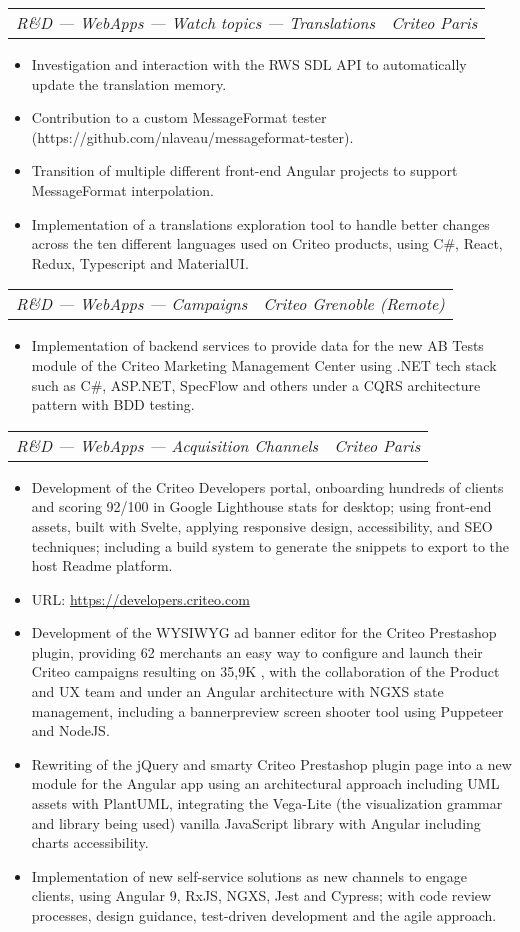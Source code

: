 \documentclass[letterpaper,11pt]{article}
\makeatletter
\newcommand{\resumeItem}[1]{
  \item\small{
    {#1 \vspace{-2pt}}
  }
}
\newcommand{\resumeSubSubheading}[2]{
    \vspace{-2pt}\item
    \begin{tabular*}{0.97\textwidth}{l@{\extracolsep{\fill}}r}
      \textit{\small#1} & \textit{\small #2} \\
    \end{tabular*}\vspace{-7pt}
}
\newcommand{\resumeItemListStart}{\begin{itemize}}
\newcommand{\resumeItemListEnd}{\end{itemize}\vspace{-5pt}}
\makeatother
\begin{document}
      \resumeSubSubheading{R\&D --- WebApps --- Watch topics --- Translations}{Criteo Paris}
      \resumeItemListStart
        \resumeItem{Investigation and interaction with the RWS SDL API to automatically update the translation memory.}
        \resumeItem{Contribution to a custom MessageFormat tester (https://github.com/nlaveau/messageformat-tester).}
        \resumeItem{Transition of multiple different front-end Angular projects to support MessageFormat interpolation.}
        \resumeItem{Implementation of a translations exploration tool to handle better changes across the ten different languages used on Criteo products, using C\#, React, Redux, Typescript and MaterialUI.}
      \resumeItemListEnd

      \resumeSubSubheading{R\&D --- WebApps --- Campaigns}{Criteo Grenoble (Remote)}
      \resumeItemListStart
        \resumeItem{Implementation of backend services to provide data for the new AB Tests module of the Criteo Marketing Management Center using .NET tech stack such as C\#, ASP.NET, SpecFlow and others under a CQRS architecture pattern with BDD testing.}
      \resumeItemListEnd

      \resumeSubSubheading{R\&D --- WebApps --- Acquisition Channels}{Criteo Paris}
      \resumeItemListStart
        \resumeItem{Development of the Criteo Developers portal, onboarding hundreds of clients and scoring 92/100 in Google Lighthouse stats for desktop; using front-end assets, built with Svelte, applying responsive design, accessibility, and SEO techniques; including a build system to generate the snippets to export to the host Readme platform.}
        \resumeItem{URL: {\href{https://developers.criteo.com}{\color{blue}https://developers.criteo.com}}}
        \resumeItem{Development of the WYSIWYG ad banner editor for the Criteo Prestashop plugin, providing 62 merchants an easy way to configure and launch their Criteo campaigns resulting on 35,9K , with the collaboration of the Product and UX team and under an Angular architecture with NGXS state management, including a bannerpreview screen shooter tool using Puppeteer and NodeJS.}
        \resumeItem{Rewriting of the jQuery and smarty Criteo Prestashop plugin page into a new module for the Angular app using an architectural approach including UML assets with PlantUML, integrating the Vega-Lite (the visualization grammar and library being used) vanilla JavaScript library with Angular including charts accessibility.}
        \resumeItem{Implementation of new self-service solutions as new channels to engage clients, using Angular 9, RxJS, NGXS, Jest and Cypress; with code review processes, design guidance, test-driven development and the agile approach.}
      \resumeItemListEnd
\end{document}
